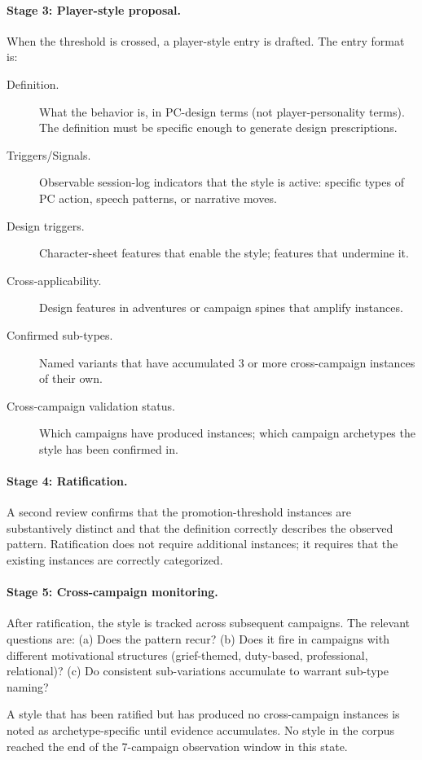 \paragraph{Stage 3: Player-style proposal.}
When the threshold is crossed, a player-style entry is drafted. The entry format is:
\begin{description}
  \item[Definition.] What the behavior is, in PC-design terms (not player-personality
    terms). The definition must be specific enough to generate design prescriptions.
  \item[Triggers/Signals.] Observable session-log indicators that the style is active:
    specific types of PC action, speech patterns, or narrative moves.
  \item[Design triggers.] Character-sheet features that enable the style; features
    that undermine it.
  \item[Cross-applicability.] Design features in adventures or campaign spines that
    amplify instances.
  \item[Confirmed sub-types.] Named variants that have accumulated 3 or more cross-campaign
    instances of their own.
  \item[Cross-campaign validation status.] Which campaigns have produced instances;
    which campaign archetypes the style has been confirmed in.
\end{description}

\paragraph{Stage 4: Ratification.}
A second review confirms that the promotion-threshold instances are substantively
distinct and that the definition correctly describes the observed pattern. Ratification
does not require additional instances; it requires that the existing instances are
correctly categorized.

\paragraph{Stage 5: Cross-campaign monitoring.}
After ratification, the style is tracked across subsequent campaigns. The relevant
questions are: (a) Does the pattern recur? (b) Does it fire in campaigns with different
motivational structures (grief-themed, duty-based, professional, relational)? (c) Do
consistent sub-variations accumulate to warrant sub-type naming?

A style that has been ratified but has produced no cross-campaign instances is noted
as archetype-specific until evidence accumulates. No style in the corpus reached the
end of the 7-campaign observation window in this state.


